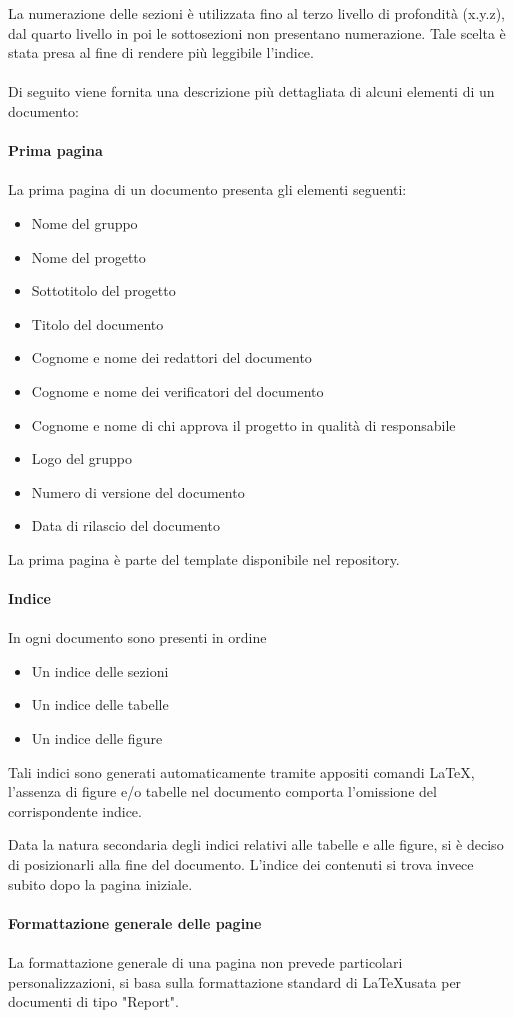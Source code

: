 \documentclass[a4paper]{report}
\begin{document}
	La numerazione delle sezioni è utilizzata fino al terzo livello di profondità (x.y.z), dal quarto livello in poi le sottosezioni non 
	presentano numerazione. Tale scelta è stata presa al fine di rendere più leggibile l'indice.
	\\ \\
	Di seguito viene fornita una descrizione più dettagliata di alcuni elementi di un documento: \\ \\
	\textbf{Prima pagina} \\ \\ 
	La prima pagina di un documento presenta gli elementi seguenti:
	\begin{itemize}
		\item Nome del gruppo
		\item Nome del progetto
		\item Sottotitolo del progetto
		\item Titolo del documento
		\item Cognome e nome dei redattori del documento
		\item Cognome e nome dei verificatori del documento
		\item Cognome e nome di chi approva il progetto in qualità di responsabile
		\item Logo del gruppo
		\item Numero di versione del documento
		\item Data di rilascio del documento
	\end{itemize}
	La prima pagina è parte del template disponibile nel repository. \\ \\
	\textbf{Indice} \\ \\
	In ogni documento sono presenti in ordine
	\begin{itemize}
		\item Un indice delle sezioni
		\item Un indice delle tabelle
		\item Un indice delle figure
	\end{itemize}
	Tali indici sono generati automaticamente tramite appositi comandi \LaTeX, l'assenza di figure 
	e/o tabelle nel documento comporta l'omissione del corrispondente indice. 
	
	Data la natura secondaria degli indici relativi alle tabelle e alle figure, si è deciso di posizionarli alla fine del documento. 	L'indice dei contenuti si trova invece subito dopo la pagina iniziale.	
	\\ \\
	\textbf{Formattazione generale delle pagine} \\ \\
	La formattazione generale di una pagina non prevede particolari personalizzazioni, si basa 
	sulla formattazione standard di \LaTeX \space usata per documenti di tipo "Report". 
\end{document}
